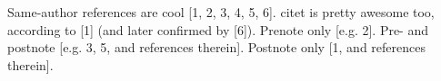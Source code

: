 \documentclass{article}
\begin{document}
Same-author references are cool [1, 2, 3, 4, 5, 6].
citet is pretty awesome too, according to [1] (and later confirmed by [6]).
Prenote only [e.g. 2].
Pre- and postnote [e.g. 3, 5, and references therein].
Postnote only [1, and references therein].

\nocite{foo2010,foo2011lorem,foo2011ipsum,foo2012,foo2011dolor,bar2013}
\end{document}
